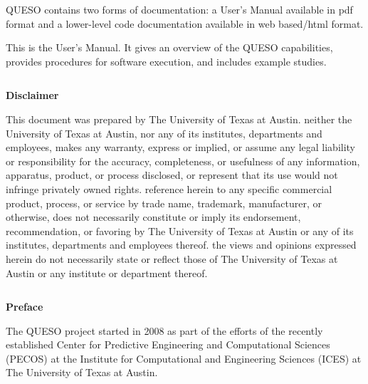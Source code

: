 QUESO contains two forms of documentation:
a User's Manual available in pdf format
and
a lower-level code documentation available in web based/html format.

This is the User's Manual.
It gives an overview of the QUESO capabilities,
provides procedures for software execution, and includes example studies.

\clearpage
$~$\\

\clearpage
\centerline{\Large\bf Disclaimer }
$~$\\
    This document was prepared
    by The University of Texas at Austin.
    neither the University of Texas
    at Austin, nor any of its institutes, departments and employees, makes any warranty, express or implied,
    or assume any legal liability or responsibility for the accuracy, completeness, or
    usefulness of any information, apparatus, product, or process disclosed, or represent
    that its use would not infringe privately owned rights. reference herein to any specific
    commercial product, process, or service by trade name, trademark, manufacturer, or otherwise,
    does not necessarily constitute or imply its endorsement, recommendation, or favoring by
    The University of Texas at Austin or any of its institutes, departments and employees thereof.
    the views and opinions expressed herein do not necessarily state or reflect
    those of The University of Texas at Austin or any institute or department
    thereof.

\clearpage
$~$\\

\clearpage
{\markboth{}{}
}
\tableofcontents


\clearpage
\thispagestyle{empty}
\centerline{\Large\bf Preface}
$~$\\
The QUESO project started in 2008 as part
of the efforts of the recently established Center for Predictive Engineering and Computational Sciences (PECOS)
at the Institute for Computational and Engineering Sciences (ICES) at The University of Texas at Austin.

